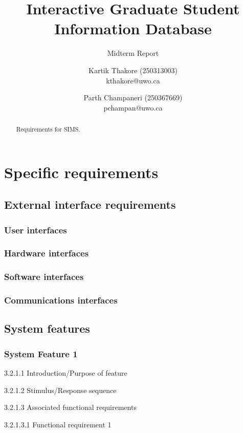 \documentclass{journal}
\begin{document}

\nocite{*}
\title{Interactive Graduate Student Information Database}
\subtitle{Midterm Report} 
\author{Kartik Thakore (250313003)\\kthakore@uwo.ca \and Parth Champaneri (250367669)\\pchampan@uwo.ca}
\maketitle

\begin{abstract}
Requirements for SIMS.

\end{abstract}

\section{Specific requirements}
\subsection{External interface requirements}
\subsubsection{User interfaces}
\subsubsection{Hardware interfaces}
\subsubsection{Software interfaces}
\subsubsection{Communications interfaces}
\subsection{System features}
\subsubsection{System Feature 1}
\begin{description}

\item{3.2.1.1} Introduction/Purpose of feature
\item{3.2.1.2} Stimulus/Response sequence
\item{3.2.1.3} Associated functional requirements
\begin{description}
\item{3.2.1.3.1} Functional requirement 1
\end{description}
\end{description}
\end{document}
